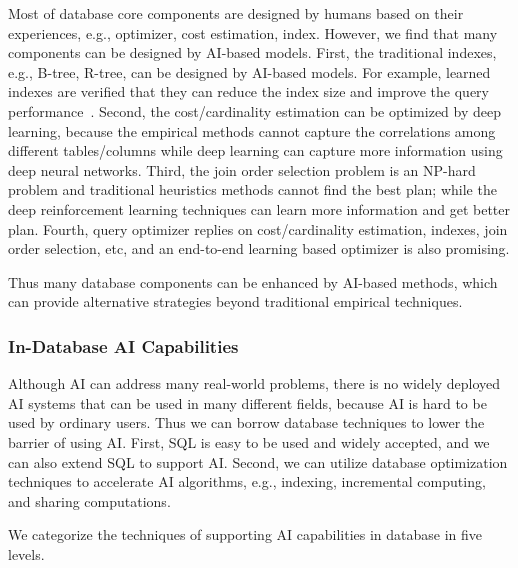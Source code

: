 Most of database core components are designed by humans based on their experiences, e.g., optimizer, cost estimation, index. However, we find that many components can be designed by AI-based models. First, the traditional indexes, e.g., B-tree, R-tree, can be designed by AI-based models. For example, learned indexes are verified that they can reduce the index size and improve the query  performance~\cite{DBLP:conf/sigmod/KraskaBCDP18}. Second, the cost/cardinality estimation can be optimized by deep learning, because the empirical methods cannot capture the correlations among different tables/columns while deep learning can capture more information using deep neural networks. Third, the join order selection problem is an NP-hard problem and traditional heuristics methods cannot find the best plan; while the deep reinforcement learning techniques can learn more information and get better plan. Fourth, query optimizer replies on cost/cardinality estimation, indexes, join order selection, etc, and an end-to-end learning based optimizer is also promising. 

Thus many database components can be enhanced by AI-based methods, which can provide alternative strategies beyond traditional empirical techniques. 



\subsubsection{In-Database AI Capabilities}
\label{subsubsec: engine}

Although AI can address many real-world problems, there is no widely deployed AI systems that can be used in many different fields, because AI is hard to be used by ordinary users. Thus we can borrow database techniques to lower the barrier of using AI.  First, SQL is easy to be used and widely accepted, and we can also extend SQL to support AI. Second, we can utilize database optimization techniques to accelerate AI algorithms, e.g., indexing, incremental computing, and sharing computations. 


We categorize the techniques of supporting AI capabilities in database in five levels. 


